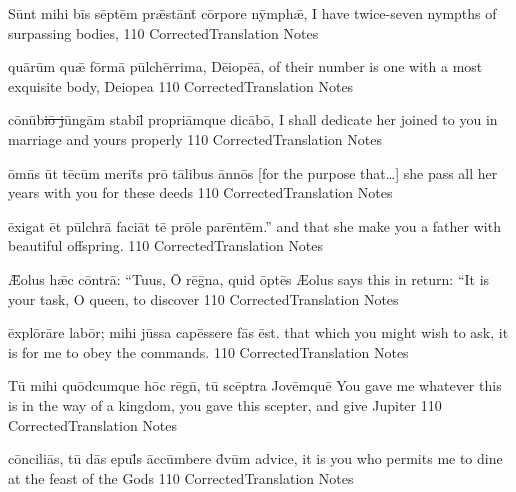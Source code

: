 \documentclass[]{book}
\begin{document}
\latline
  {S\=unt m\-ih\-i b\=is s\=ept\=em pr\={\ae}st\=ant\={\macron {\i}} c\=orp\-or\-e n\=ymph\={\ae},
}
  {I have twice-seven nympths of surpassing bodies, }
  {110}
  { CorrectedTranslation }
  { Notes }


\latline
  {qu\={\macron a}r\=um qu\={\ae} f\=orm\={\macron a} p\=ulch\=err\-im\-a, D\={\macron e}\-i\-op\={\macron e}\=a,
}
  { of their number is one with a most exquisite body, Deiopea }
  {110}
  { CorrectedTranslation }
  { Notes }


\latline
  {c\={\macron o}n\={\macron u}b\sout{i\={\macron o} j}\=ung\=am st\-ab\-il\={\macron {\i}} pr\-opr\-i\=amqu\-e d\-ic\={\macron a}b\=o,
}
  { I shall dedicate her joined to you in marriage and yours properly }
  {110}
  { CorrectedTranslation }
  { Notes }

\newpage
\latline
  {\=omn\={\macron {\i}}s \=ut t\={\macron e}c\=um m\-er\-it\={\macron {\i}}s pr\={\macron o} t\={\macron a}l\-ib\-us \=ann\={\macron o}s
}
  { [for the purpose that\ldots] she pass all her years with you for these deeds }
  {110}
  { CorrectedTranslation }
  { Notes }


\latline
  {\=ex\-ig\-at \=et p\=ulchr\={\macron a} f\-ac\-i\=at t\={\macron e} pr\={\macron o}l\-e p\-ar\=ent\=em.''
}
  { and that she make you a father with beautiful offspring. }
  {110}
  { CorrectedTranslation }
  { Notes }


\latline
  {\={\AE}\-ol\-us h\={\ae}c c\=ontr\={\macron a}:  ``T\-u\-us, \={\macron O} r\={\macron e}g\={\macron {\i}}n\-a, qu\-id \=opt\={\macron e}s}
  { {\AE}olus says this in return:  ``It is your task, O queen, to discover  }
  {110}
  { CorrectedTranslation }
  { Notes }
\newpage

\latline
  {\=expl\={\macron o}r\={\macron a}r\-e l\-ab\=or; m\-ih\-i j\=uss\-a c\-ap\=ess\-er\-e f\={\macron a}s \=est.
}
  { that which you might wish to ask, it is for me to obey the commands. }
  {110}
  { CorrectedTranslation }
  { Notes }


\latline
  {T\={\macron u} m\-ih\-i qu\=odc\-umqu\-e h\=oc r\={\macron e}gn\={\macron {\i}}, t\={\macron u} sc\={\macron e}ptr\-a J\-ov\=emqu\=e
}
  { You gave me whatever this is in the way of a kingdom, you gave this scepter, and give Jupiter }
  {110}
  { CorrectedTranslation }
  { Notes }


\latline
  {c\=onc\-il\-i\={\macron a}s, t\={\macron u} d\={\macron a}s \-ep\-ul\={\macron {\i}}s \=acc\=umb\-er\-e d\={\macron {\i}}v\=um
}
  { advice, it is you who permits me to dine at the feast of the Gods }
  {110}
  { CorrectedTranslation }
  { Notes }
\newpage
\end{document}
